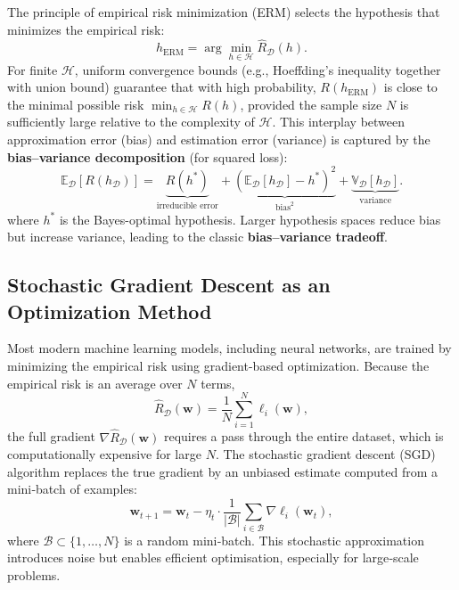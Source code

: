 \documentclass{tufte-handout}
\begin{document}
The principle of empirical risk minimization (ERM) \cite{Vapnik1998} selects the hypothesis that minimizes the empirical risk:
\begin{equation}
    h_{\text{ERM}} = \arg\min_{h \in \mathcal{H}} \widehat{R}_{\mathcal{D}}(h).
\end{equation}
For finite $\mathcal{H}$, uniform convergence bounds (e.g., Hoeffding's inequality together with union bound) guarantee that with high probability, $R(h_{\text{ERM}})$ is close to the minimal possible risk $\min_{h \in \mathcal{H}} R(h)$, provided the sample size $N$ is sufficiently large relative to the complexity of $\mathcal{H}$. This interplay between approximation error (bias) and estimation error (variance) is captured by the \textbf{bias–variance decomposition} (for squared loss):
\begin{equation}
    \mathbb{E}_{\mathcal{D}} \left[ R(h_{\mathcal{D}}) \right] = \underbrace{R(h^*)}_{\text{irreducible error}} + \underbrace{\left( \mathbb{E}_{\mathcal{D}}[h_{\mathcal{D}}] - h^* \right)^2}_{\text{bias}^2} + \underbrace{\mathbb{V}_{\mathcal{D}}[h_{\mathcal{D}}]}_{\text{variance}}.
\end{equation}
where $h^*$ is the Bayes-optimal hypothesis. Larger hypothesis spaces reduce bias but increase variance, leading to the classic \textbf{bias–variance tradeoff}.

\subsection{Stochastic Gradient Descent as an Optimization Method}

Most modern machine learning models, including neural networks, are trained by minimizing the empirical risk using gradient-based optimization. Because the empirical risk is an average over $N$ terms,
\[
\widehat{R}_{\mathcal{D}}(\mathbf{w}) = \frac{1}{N} \sum_{i=1}^N \ell_i(\mathbf{w}),
\]
the full gradient $\nabla \widehat{R}_{\mathcal{D}}(\mathbf{w})$ requires a pass through the entire dataset, which is computationally expensive for large $N$. The stochastic gradient descent (SGD) algorithm replaces the true gradient by an unbiased estimate computed from a mini‑batch of examples:
\[
\mathbf{w}_{t+1} = \mathbf{w}_t - \eta_t \cdot \frac{1}{|\mathcal{B}|} \sum_{i \in \mathcal{B}} \nabla \ell_i(\mathbf{w}_t),
\]
where $\mathcal{B} \subset \{1,\dots,N\}$ is a random mini‑batch. This stochastic approximation introduces noise but enables efficient optimisation, especially for large‑scale problems.
\end{document}

